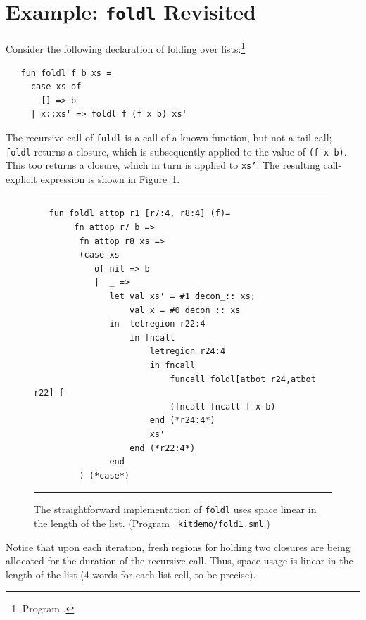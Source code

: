 \documentclass[12pt]{book}
\begin{document}
\section{Example: {\tt foldl}  Revisited}
\label{foldl.sec}
Consider the following declaration of folding over
lists:\footnote{Program .}
\begin{verbatim}
   fun foldl f b xs = 
     case xs of 
       [] => b
     | x::xs' => foldl f (f x b) xs'
\end{verbatim}
The recursive call of 
%
{\tt foldl} is a call of a known function, but not a tail call; {\tt
  foldl} returns a closure, which is subsequently applied to the value
of {\tt (f x b)}. This too returns a closure, which in turn is applied
to {\tt xs'}.  The resulting call-explicit expression is shown in
Figure~\ref{fold1.fig}.
\begin{figure}
\hrule \medskip
\begin{verbatim}
   fun foldl attop r1 [r7:4, r8:4] (f)= 
        fn attop r7 b => 
         fn attop r8 xs => 
         (case xs 
            of nil => b
            |  _ => 
               let val xs' = #1 decon_:: xs; 
                   val x = #0 decon_:: xs
               in  letregion r22:4 
                   in fncall 
                       letregion r24:4 
                       in fncall 
                           funcall foldl[atbot r24,atbot r22] f 
                           (fncall fncall f x b) 
                       end (*r24:4*) 
                       xs' 
                   end (*r22:4*)
               end 
         ) (*case*) 
\end{verbatim}
\caption{The straightforward implementation of {\tt foldl} uses space 
  linear in the length of the list. (Program {\tt
    kitdemo/fold1.sml}.)}  
\medskip \hrule \label{fold1.fig}
\end{figure}
Notice that upon each iteration, fresh regions for holding two
closures are being allocated for the duration of the recursive call.
Thus, space usage is linear in the length of the list (4 words for
each list cell, to be precise).
\end{document}
